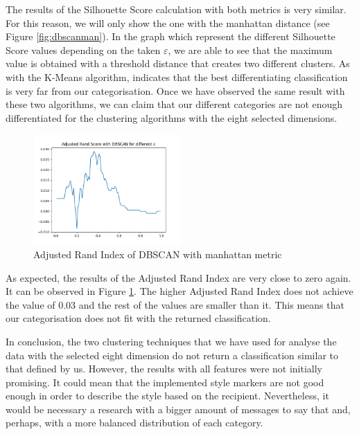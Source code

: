 The results of the Silhouette Score calculation with both metrics is very similar. For this reason, we will only show the one with the manhattan distance (see Figure \ref{fig:dbscanman}). In the graph which represent the different Silhouette Score values depending on the taken $\varepsilon$, we are able to see that the maximum value is obtained with a threshold distance that creates two different clusters. As with the K-Means algorithm, indicates that the best differentiating classification is very far from our categorisation. Once we have observed the same result with these two algorithms, we can claim that our different categories are not enough differentiated for the clustering algorithms with the eight selected dimensions.

\begin{figure}[h]
	\centering%
	\centerline{\includegraphics[width=0.5\textwidth]{Imagenes/Bitmap/Clustering/dbscan8ari.png}}%
	\caption{Adjusted Rand Index of DBSCAN with manhattan metric}%
	\label{fig:dbscan8ari}
\end{figure}

As expected, the results of the Adjusted Rand Index are very close to zero again. It can be observed in Figure \ref{fig:dbscan8ari}. The higher Adjusted Rand Index does not achieve the value of 0.03 and the rest of the values are smaller than it. This means that our categorisation does not fit with the returned classification.

In conclusion, the two clustering techniques that we have used for analyse the data with the selected eight dimension do not return a classification similar to that defined by us. However, the results with all features were not initially promising. It could mean that the implemented style markers are not good enough in order to describe the style based on the recipient. Nevertheless, it would be necessary a research with a bigger amount of messages to say that and, perhaps, with a more balanced distribution of each category.